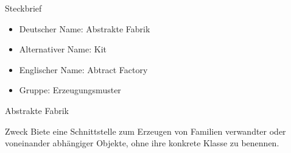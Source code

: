 \begin{frame}{Steckbrief}
	\begin{itemize}
 		\item Deutscher Name: Abstrakte Fabrik
 		\item Alternativer Name: Kit
 		\item Englischer Name: Abtract Factory
 		\item Gruppe: Erzeugungsmuster
 	\end{itemize}
\end{frame}

\begin{frame}{Abstrakte Fabrik}
	\begin{block}{Zweck}
 		Biete eine Schnittstelle zum Erzeugen von Familien verwandter oder voneinander abhängiger Objekte, ohne ihre konkrete Klasse zu benennen.
 	\end{block}
\end{frame}

